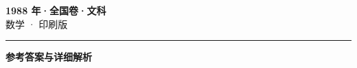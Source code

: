 \documentclass[zihao=5, a4paper]{ctexart}
\begin{document}
\begin{center}
  {\Large\bfseries 1988 年·全国卷·文科}\\[4pt]
  {\large 数学 · 印刷版}
\end{center}
\medskip
{}

\par\bigskip\hrule\bigskip
{}
\begin{center}{\large\bfseries 参考答案与详细解析}\end{center}
\smallskip

\end{document}
